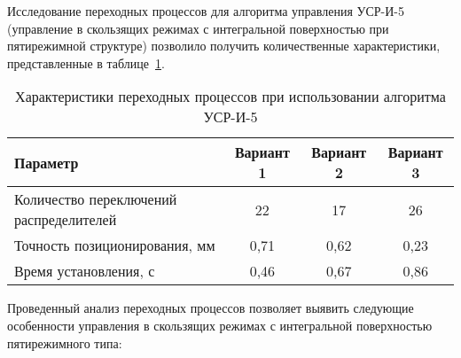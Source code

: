 Исследование переходных процессов для алгоритма управления УСР-И-5 (управление в скользящих режимах с интегральной поверхностью при пятирежимной структуре)
позволило получить количественные характеристики, представленные в таблице~\ref{tab:transition_processes_usr_i_5}.

\begin{table}[h]
	\centering
	\caption{Характеристики переходных процессов при использовании алгоритма УСР-И-5}
	\label{tab:transition_processes_usr_i_5}
	\small
	\begin{tabular}{lccc}
		\midrule
		\textbf{Параметр}                       & \textbf{Вариант 1} & \textbf{Вариант 2} & \textbf{Вариант 3} \\
		\midrule
		Количество переключений распределителей & 22                 & 17                 & 26                 \\
		Точность позиционирования, мм           & 0,71               & 0,62               & 0,23               \\
		Время установления, с                   & 0,46               & 0,67               & 0,86               \\
		\midrule
	\end{tabular}
\end{table}

Проведенный анализ переходных процессов позволяет выявить следующие особенности
управления в скользящих режимах с интегральной поверхностью пятирежимного типа:

